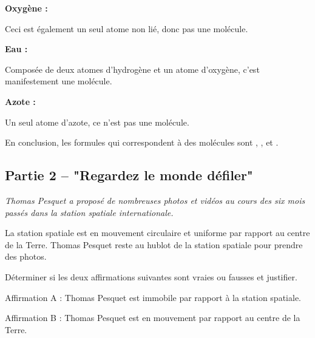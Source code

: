 \documentclass[answers]{exam}
\begin{document}
\begin{questions}
\begin{solution}
\begin{compactitem}
    \item \textbf{Oxygène : } 
    \begin{compactitem}
        \item Ceci est également un seul atome non lié, donc pas une molécule.
    \end{compactitem}
    
    \item \textbf{Eau : } 
    \begin{compactitem}
        \item Composée de deux atomes d'hydrogène et un atome d'oxygène, c'est manifestement une molécule.
    \end{compactitem}

    \item \textbf{Azote : } 
    \begin{compactitem}
        \item Un seul atome d'azote, ce n'est pas une molécule.
    \end{compactitem}
\end{compactitem}

En conclusion, les formules qui correspondent à des molécules sont , , et .
\end{solution}

\subsection*{Partie 2 – "Regardez le monde défiler"}
  
\textit{Thomas Pesquet a proposé de nombreuses photos et vidéos au cours des six mois passés dans la station spatiale internationale.}

  \question[4] La station spatiale est en mouvement circulaire et uniforme par rapport au centre de la Terre. Thomas Pesquet reste au hublot de la station spatiale pour prendre des photos.
  
  Déterminer si les deux affirmations suivantes sont vraies ou fausses et justifier.
  
  \begin{compactitem}
  \item Affirmation A : Thomas Pesquet est immobile par rapport à la station spatiale.
  \item Affirmation B : Thomas Pesquet est en mouvement par rapport au centre de la Terre.
  \end{compactitem}
  
  


\end{questions}
\end{document}
